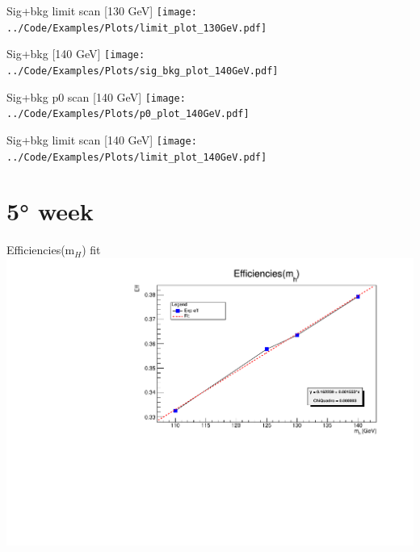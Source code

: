 \documentclass[10pt,UKenglish, leqno, xcolor = dvipsnames]{beamer}
\begin{document}
		\begin{frame}{Sig+bkg limit scan [130 GeV]}
			\vfill
			\texttt{[image: ../Code/Examples/Plots/limit\_plot\_130GeV.pdf]}
			\vfill
		\end{frame}
	
		\begin{frame}{Sig+bkg [140 GeV]}
			\vfill
			\texttt{[image: ../Code/Examples/Plots/sig\_bkg\_plot\_140GeV.pdf]}
			\vfill
		\end{frame}
		
		\begin{frame}{Sig+bkg p0 scan [140 GeV]}
			\vfill
			\texttt{[image: ../Code/Examples/Plots/p0\_plot\_140GeV.pdf]}
			\vfill
		\end{frame}
		
		\begin{frame}{Sig+bkg limit scan [140 GeV]}
			\vfill
			\texttt{[image: ../Code/Examples/Plots/limit\_plot\_140GeV.pdf]}
			\vfill
		\end{frame}
	
	\section{5° week}
	\SectionPage
		
		\begin{frame}{Efficiencies(m$_H$) fit}
			\vfill
			\includegraphics[width=1.\textwidth]{../images/efficiencies_fit.pdf}
			\vfill
		\end{frame}
	
\end{document}
